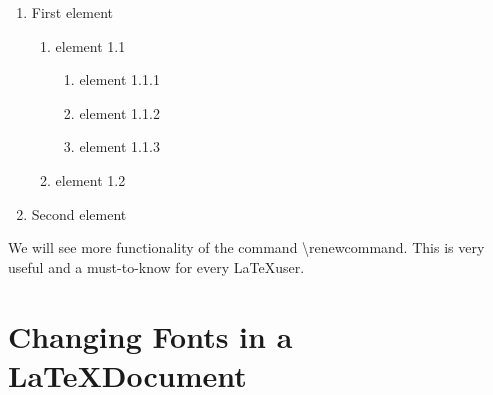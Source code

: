 \documentclass[a4paper]{article}
\begin{document}
\renewcommand\labelenumii{\theenumii]] ->}

\begin{enumerate}
  \item First element
    \begin{enumerate}
      \item element 1.1
      \begin{enumerate}
        \item element 1.1.1
        \item element 1.1.2
        \item element 1.1.3
      \end{enumerate}
      \item element 1.2
    \end{enumerate}
  \item Second element
\end{enumerate}

We will see more functionality of the command \textbackslash{}renewcommand. This is very useful and a must-to-know for every \LaTeX user.

\section{Changing Fonts in a \LaTeX Document}
\end{document}
